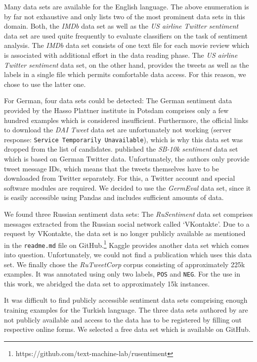  Many data sets are available for the English language. The above enumeration is by far not exhaustive and only lists two of the most prominent data sets in this domain. Both, the \textit{IMDb} data set as well as the \textit{US airline Twitter sentiment} data set are used quite frequently to evaluate classifiers on the task of sentiment analysis. The \textit{IMDb} data set consists of one text file for each movie review which is associated with additional effort in the data reading phase. The \textit{US airline Twitter sentiment} data set, on the other hand, provides the tweets as well as the labels in a single file which permits comfortable data access. For this reason, we chose to use the latter one.

 For German, four data sets could be detected: The German sentiment data provided by the Hasso Plattner institute in Potsdam comprises only a few hundred examples which is considered insufficient. Furthermore, the official links to download the \textit{DAI Tweet} data set are unfortunately not working (server response: \texttt{Service Temporarily Unavailable}), which is why this data set was dropped from the list of candidates. \citep{Cieliebak.2017} published the \textit{SB-10k sentiment} data set which is based on German Twitter data. Unfortunately, the authors only provide tweet message IDs, which means that the tweets themselves have to be downloaded from Twitter separately. For this, a Twitter account and special software modules are required. We decided to use the \textit{GermEval} data set, since it is easily accessible using Pandas and includes sufficient amounts of data.

 We found three Russian sentiment data sets: The \textit{RuSentiment} data set comprises messages extracted from the Russian social network called `VKontakte'. Due to a request by VKontakte, the data set is no longer publicly available as mentioned in the \texttt{readme.md} file on GitHub\github.\footnote{https://github.com/text-machine-lab/rusentiment} Kaggle provides another data set which comes into question. Unfortunately, we could not find a publication which uses this data set. We finally chose the \textit{RuTweetCorp} corpus consisting of approximately 225k examples. It was annotated using only two labels, \texttt{POS} and \texttt{NEG}. For the use in this work, we abridged the data set to approximately 15k instances.

 It was difficult to find publicly accessible sentiment data sets comprising enough training examples for the Turkish language. The three data sets authored by \citep{AlpTocoglu.2018,Hayran.2017,Ucan.2016} are not publicly available and access to the data has to be registered by filling out respective online forms. We selected a free data set which is available on GitHub\github.

